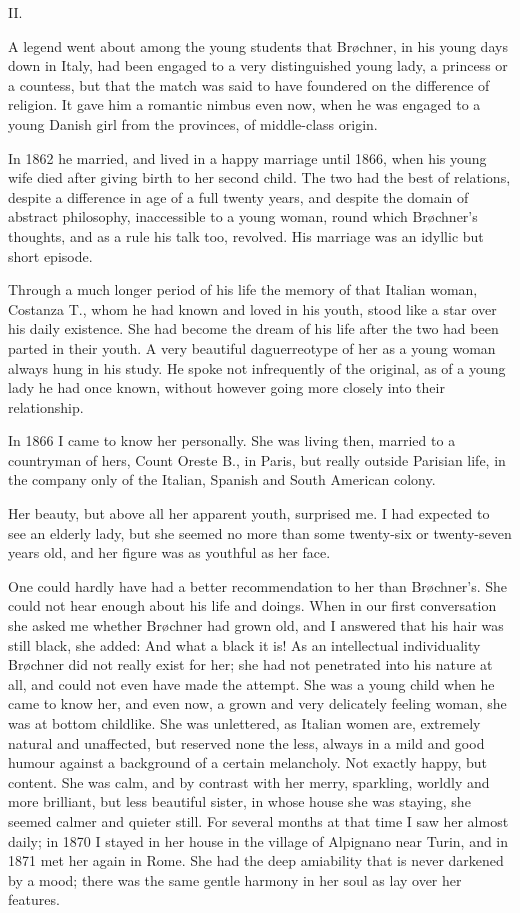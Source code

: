 \documentclass[12pt,a4paper,openany]{book}
\newcommand{\opage}[1]{\marginnote{\footnotesize\textit{[#1]}}}
\newcommand{\sectionnum}[1]{\begin{center}#1\end{center}}
\begin{document}
\sectionnum{II.}

A legend went about among the young students that Brøchner, in his young days
down in Italy, had been engaged to a very distinguished young lady, a princess
or a countess, but that the match was said to have foundered on
\opage{238}the difference of religion. It gave him a romantic nimbus even now, when he
was engaged to a young Danish girl from the provinces, of middle-class
origin.

In 1862 he married, and lived in a happy marriage until 1866, when his young
wife died after giving birth to her second child. The two had the best of
relations, despite a difference in age of a full twenty years, and despite the
domain of abstract philosophy, inaccessible to a young woman, round which
Brøchner's thoughts, and as a rule his talk too, revolved. His marriage was an
idyllic but short episode.

Through a much longer period of his life the memory of that Italian woman,
Costanza T., whom he had known and loved in his youth, stood like a star over
his daily existence. She had become the dream of his life after the two had
been parted in their youth. A very beautiful daguerreotype of her as a young
woman always hung in his study. He spoke not infrequently of the original, as
of a young lady he had once known, without however going more closely into
their relationship.

In 1866 I came to know her personally. She was living then, married to a
countryman of hers, Count Oreste B., in Paris, but really
\opage{239}outside Parisian life, in the company only of the Italian, Spanish and South
American colony.

Her beauty, but above all her apparent youth, surprised me. I had expected to
see an elderly lady, but she seemed no more than some twenty-six or
twenty-seven years old, and her figure was as youthful as her face.

One could hardly have had a better recommendation to her than Brøchner's. She
could not hear enough about his life and doings. When in our first
conversation she asked me whether Brøchner had grown old, and I answered that
his hair was still black, she added: And what a black it is! As an
intellectual individuality Brøchner did not really exist for her; she had not
penetrated into his nature at all, and could not even have made the attempt.
She was a young child when he came to know her, and even now, a grown and very
delicately feeling woman, she was at bottom childlike. She was unlettered, as
Italian women are, extremely natural and unaffected, but reserved none the
less, always in a mild and good humour against a background of a certain
melancholy. Not exactly happy, but content. She was calm, and by contrast with
her merry, sparkling, worldly and more brilliant, but less beautiful
\opage{240}sister, in whose house she was staying, she seemed calmer and quieter still.
For several months at that time I saw her almost daily; in 1870 I stayed in
her house in the village of Alpignano near Turin, and in 1871 met her again in
Rome. She had the deep amiability that is never darkened by a mood; there was
the same gentle harmony in her soul as lay over her features.
\end{document}
